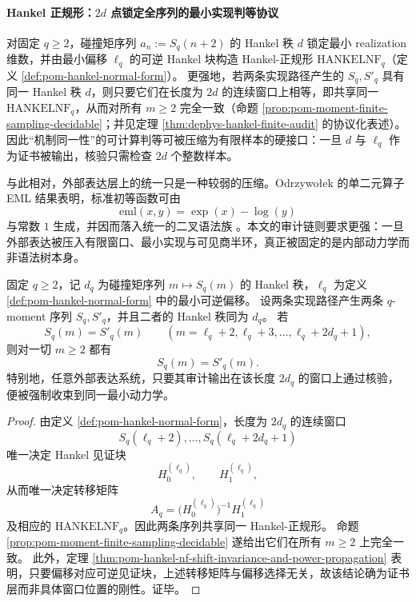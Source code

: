 \paragraph{Hankel 正规形：\texorpdfstring{$2d$}{2d} 点锁定全序列的最小实现判等协议}
对固定 \(q\ge 2\)，碰撞矩序列 \(a_n:=S_q(n+2)\) 的 Hankel 秩 \(d\) 锁定最小 realization 维数，并由最小偏移 \(\ell_q\) 的可逆 Hankel 块构造 Hankel-正规形
\(\mathrm{HANKELNF}_q\)（定义 \ref{def:pom-hankel-normal-form}）。
更强地，若两条实现路径产生的 \(S_q,S'_q\) 具有同一 Hankel 秩 \(d\)，则只要它们在长度为 \(2d\) 的连续窗口上相等，即共享同一 \(\mathrm{HANKELNF}_q\)，从而对所有 \(m\ge 2\) 完全一致（命题 \ref{prop:pom-moment-finite-sampling-decidable}；并见定理 \ref{thm:dephys-hankel-finite-audit} 的协议化表述）。
因此“机制同一性”的可计算判等可被压缩为有限样本的硬接口：一旦 \(d\) 与 \(\ell_q\) 作为证书被输出，核验只需检查 \(2d\) 个整数样本。

与此相对，外部表达层上的统一只是一种较弱的压缩。Odrzywo{\l}ek 的单二元算子 EML 结果表明，标准初等函数可由
\[
\mathrm{eml}(x,y)=\exp(x)-\log(y)
\]
与常数 \(1\) 生成，并因而落入统一的二叉语法族 \cite{Odrzywolek2026SingleBinaryOperator}。本文的审计链则要求更强：一旦外部表达被压入有限窗口、最小实现与可见商半环，真正被固定的是内部动力学而非语法树本身。

\begin{theorem}\label{thm:discussion-hankel-syntax-independent-rigidity}
固定 \(q\ge 2\)，记 \(d_q\) 为碰撞矩序列 \(m\mapsto S_q(m)\) 的 Hankel 秩，\(\ell_q\) 为定义 \ref{def:pom-hankel-normal-form} 中的最小可逆偏移。
设两条实现路径产生两条 \(q\)-moment 序列 \(S_q,S'_q\)，并且二者的 Hankel 秩同为 \(d_q\)。
若
\[
S_q(m)=S'_q(m)
\qquad
(m=\ell_q+2,\ell_q+3,\dots,\ell_q+2d_q+1),
\]
则对一切 \(m\ge 2\) 都有
\[
S_q(m)=S'_q(m).
\]
特别地，任意外部表达系统，只要其审计输出在该长度 \(2d_q\) 的窗口上通过核验，便被强制收束到同一最小动力学。
\end{theorem}
\begin{proof}
由定义 \ref{def:pom-hankel-normal-form}，长度为 \(2d_q\) 的连续窗口
\[
S_q(\ell_q+2),\dots,S_q(\ell_q+2d_q+1)
\]
唯一决定 Hankel 见证块
\[
H_0^{(\ell_q)},\qquad H_1^{(\ell_q)},
\]
从而唯一决定转移矩阵
\[
A_q=\bigl(H_0^{(\ell_q)}\bigr)^{-1}H_1^{(\ell_q)}
\]
及相应的 \(\mathrm{HANKELNF}_q\)。因此两条序列共享同一 Hankel-正规形。
命题 \ref{prop:pom-moment-finite-sampling-decidable} 遂给出它们在所有 \(m\ge 2\) 上完全一致。
此外，定理 \ref{thm:pom-hankel-nf-shift-invariance-and-power-propagation} 表明，只要偏移对应可逆见证块，上述转移矩阵与偏移选择无关，故该结论确为证书层而非具体窗口位置的刚性。证毕。
\end{proof}

